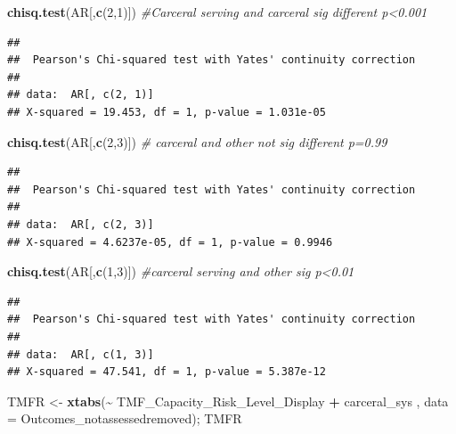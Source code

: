 \documentclass[
]{article}
\newenvironment{Shaded}{\begin{snugshade}}{\end{snugshade}}
\newcommand{\AttributeTok}[1]{\textcolor[rgb]{0.13,0.29,0.53}{#1}}
\newcommand{\CommentTok}[1]{\textcolor[rgb]{0.56,0.35,0.01}{\textit{#1}}}
\newcommand{\DecValTok}[1]{\textcolor[rgb]{0.00,0.00,0.81}{#1}}
\newcommand{\FunctionTok}[1]{\textcolor[rgb]{0.13,0.29,0.53}{\textbf{#1}}}
\newcommand{\NormalTok}[1]{#1}
\newcommand{\OtherTok}[1]{\textcolor[rgb]{0.56,0.35,0.01}{#1}}
\newcommand{\SpecialCharTok}[1]{\textcolor[rgb]{0.81,0.36,0.00}{\textbf{#1}}}
\begin{document}
\begin{Shaded}
\begin{Highlighting}[]
\FunctionTok{chisq.test}\NormalTok{(AR[,}\FunctionTok{c}\NormalTok{(}\DecValTok{2}\NormalTok{,}\DecValTok{1}\NormalTok{)]) }\CommentTok{\#Carceral serving and carceral sig different p\textless{}0.001}
\end{Highlighting}
\end{Shaded}

\begin{verbatim}
## 
##  Pearson's Chi-squared test with Yates' continuity correction
## 
## data:  AR[, c(2, 1)]
## X-squared = 19.453, df = 1, p-value = 1.031e-05
\end{verbatim}

\begin{Shaded}
\begin{Highlighting}[]
\FunctionTok{chisq.test}\NormalTok{(AR[,}\FunctionTok{c}\NormalTok{(}\DecValTok{2}\NormalTok{,}\DecValTok{3}\NormalTok{)]) }\CommentTok{\# carceral and other not sig different p=0.99}
\end{Highlighting}
\end{Shaded}

\begin{verbatim}
## 
##  Pearson's Chi-squared test with Yates' continuity correction
## 
## data:  AR[, c(2, 3)]
## X-squared = 4.6237e-05, df = 1, p-value = 0.9946
\end{verbatim}

\begin{Shaded}
\begin{Highlighting}[]
\FunctionTok{chisq.test}\NormalTok{(AR[,}\FunctionTok{c}\NormalTok{(}\DecValTok{1}\NormalTok{,}\DecValTok{3}\NormalTok{)]) }\CommentTok{\#carceral serving and other sig p\textless{}0.01}
\end{Highlighting}
\end{Shaded}

\begin{verbatim}
## 
##  Pearson's Chi-squared test with Yates' continuity correction
## 
## data:  AR[, c(1, 3)]
## X-squared = 47.541, df = 1, p-value = 5.387e-12
\end{verbatim}

\begin{Shaded}
\begin{Highlighting}[]
\NormalTok{TMFR }\OtherTok{\textless{}{-}} \FunctionTok{xtabs}\NormalTok{(}\SpecialCharTok{\textasciitilde{}}\NormalTok{ TMF\_Capacity\_Risk\_Level\_Display }\SpecialCharTok{+}\NormalTok{ carceral\_sys , }\AttributeTok{data =}\NormalTok{ Outcomes\_notassessedremoved); TMFR}
\end{Highlighting}
\end{Shaded}
\end{document}
